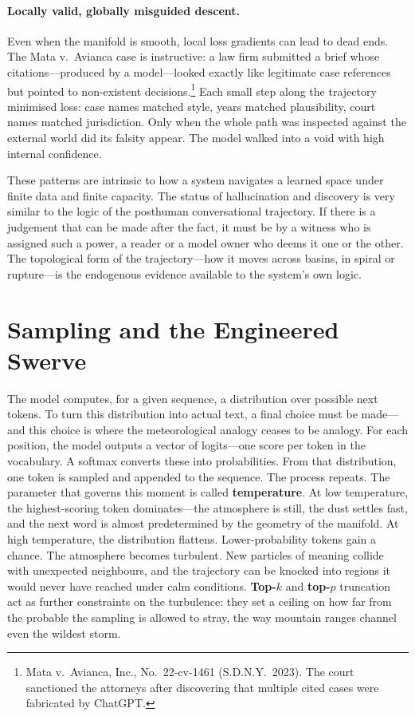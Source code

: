 \paragraph{Locally valid, globally misguided descent.} Even when the manifold is smooth, local loss gradients can lead to dead ends. The Mata v.\ Avianca case is instructive: a law firm submitted a brief whose citations---produced by a model---looked exactly like legitimate case references but pointed to non-existent decisions.\footnote{Mata v.\ Avianca, Inc., No.\ 22-cv-1461 (S.D.N.Y.\ 2023). The court sanctioned the attorneys after discovering that multiple cited cases were fabricated by ChatGPT.} Each small step along the trajectory minimised loss: case names matched style, years matched plausibility, court names matched jurisdiction. Only when the whole path was inspected against the external world did its falsity appear. The model walked into a void with high internal confidence.

These patterns are intrinsic to how a system navigates a learned space under finite data and finite capacity. The status of hallucination and discovery is very similar to the logic of the posthuman conversational trajectory. If there is a judgement that can be made after the fact, it must be by a witness who is assigned such a power, a reader or a model owner who deems it one or the other. The topological form of the trajectory---how it moves across basins, in spiral or rupture---is the endogenous evidence available to the system's own logic.


\section{Sampling and the Engineered Swerve}
The model computes, for a given sequence, a distribution over possible next tokens. To turn this distribution into actual text, a final choice must be made---and this choice is where the meteorological analogy ceases to be analogy.
For each position, the model outputs a vector of logits---one score per token in the vocabulary. A softmax converts these into probabilities. From that distribution, one token is sampled and appended to the sequence. The process repeats.
The parameter that governs this moment is called \textbf{temperature}. At low temperature, the highest-scoring token dominates---the atmosphere is still, the dust settles fast, and the next word is almost predetermined by the geometry of the manifold. At high temperature, the distribution flattens. Lower-probability tokens gain a chance. The atmosphere becomes turbulent. New particles of meaning collide with unexpected neighbours, and the trajectory can be knocked into regions it would never have reached under calm conditions. \textbf{Top-$k$} and \textbf{top-$p$} truncation act as further constraints on the turbulence: they set a ceiling on how far from the probable the sampling is allowed to stray, the way mountain ranges channel even the wildest storm.

